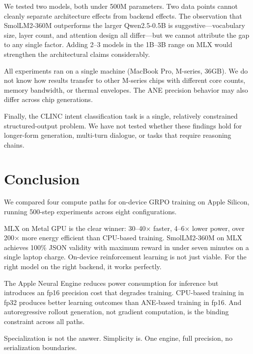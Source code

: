 \documentclass[11pt]{article}
\begin{document}
We tested two models, both under 500M parameters.  Two data points cannot cleanly separate architecture effects from backend effects.  The observation that SmolLM2-360M outperforms the larger Qwen2.5-0.5B is suggestive---vocabulary size, layer count, and attention design all differ---but we cannot attribute the gap to any single factor.  Adding 2--3 models in the 1B--3B range on MLX would strengthen the architectural claims considerably.

All experiments ran on a single machine (MacBook Pro, M-series, 36GB).  We do not know how results transfer to other M-series chips with different core counts, memory bandwidth, or thermal envelopes.  The ANE precision behavior may also differ across chip generations.

Finally, the CLINC intent classification task is a single, relatively constrained structured-output problem.  We have not tested whether these findings hold for longer-form generation, multi-turn dialogue, or tasks that require reasoning chains.

\section{Conclusion}
\label{sec:conclusion}

We compared four compute paths for on-device GRPO training on Apple Silicon, running 500-step experiments across eight configurations.

MLX on Metal GPU is the clear winner: 30--40$\times$ faster, 4--6$\times$ lower power, over 200$\times$ more energy efficient than CPU-based training.  SmolLM2-360M on MLX achieves 100\% JSON validity with maximum reward in under seven minutes on a single laptop charge.  On-device reinforcement learning is not just viable.  For the right model on the right backend, it works perfectly.

The Apple Neural Engine reduces power consumption for inference but introduces an fp16 precision cost that degrades training.  CPU-based training in fp32 produces better learning outcomes than ANE-based training in fp16.  And autoregressive rollout generation, not gradient computation, is the binding constraint across all paths.

Specialization is not the answer.  Simplicity is.  One engine, full precision, no serialization boundaries.
\end{document}
